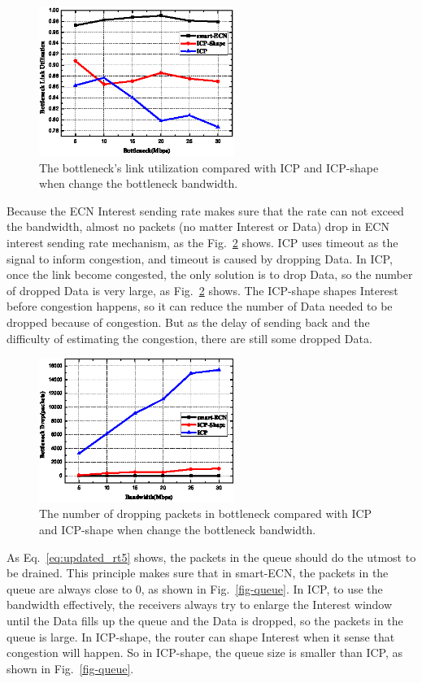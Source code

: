 \begin{figure}[t]
	\centering
	\includegraphics[width=2.5in]{utilization-pic-cut.eps}
	\caption{The bottleneck's link utilization compared with ICP and ICP-shape when change the bottleneck bandwidth.}
	\label{fig-linkuti}
\end{figure}

Because the ECN Interest sending rate makes sure that the rate can not exceed the bandwidth, almost no packets (no matter Interest or Data) drop in ECN interest sending rate mechanism, as the Fig.~\ref{fig-drop} shows. ICP uses timeout as the signal to inform congestion, and timeout is caused by dropping Data. In ICP, once the link become congested, the only solution is to drop Data, so the number of dropped Data is very large, as Fig.~\ref{fig-drop} shows. The ICP-shape shapes Interest before congestion happens, so it can reduce the number of Data needed to be dropped because of congestion. But as the delay of sending back and the difficulty of estimating the congestion, there are still some dropped Data.

\begin{figure}[t]
	\centering
	\includegraphics[width=2.5in]{drop-pic-cut.eps}
	\caption{The number of dropping packets in bottleneck compared with ICP and ICP-shape when change the bottleneck bandwidth.}
	\label{fig-drop}
\end{figure}

As Eq.~\ref{eq:updated_rt5} shows, the packets in the queue should do the utmost to be drained. This principle makes sure that in smart-ECN, the packets in the queue are always close to 0, as shown in Fig.~\ref{fig-queue}. In ICP, to use the bandwidth effectively, the receivers always try to enlarge the Interest window until the Data fills up the queue and the Data is dropped, so the packets in the queue is large. In ICP-shape, the router can shape Interest when it sense that congestion will happen. So in ICP-shape, the queue size is smaller than ICP, as shown in Fig.~\ref{fig-queue}.


